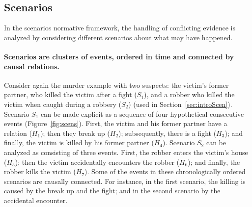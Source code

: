 \documentclass[10pt]{article}
\begin{document}

  


\subsection{Scenarios}

In the scenarios normative framework, the handling of conflicting evidence is analyzed by considering different scenarios about what may have happened.

\paragraph{Scenarios are clusters of events, ordered in time and connected by causal relations.} Consider again the murder example with two suspects: the victim's former partner, who killed the victim after a fight ($S_1$), and a robber who killed the victim when caught during a robbery ($S_2$) (used in Section~\ref{sec:introScen}). Scenario $S_1$ can be made explicit as a sequence of four hypothetical consecutive events (Figure~\ref{fig:scens}). First, the victim and his former partner have a relation ($H_1$); then they break up ($H_2$); subsequently, there is a fight ($H_3$); and finally, the victim is killed by his former partner ($H_4$). Scenario $S_2$ can be analyzed as consisting of three events. First, the robber enters the victim's house ($H_5$); then the victim accidentally encounters the robber ($H_6$); and finally, the robber kills the victim ($H_7$). Some of the events in these chronologically ordered scenarios are causally connected. For instance, in the first scenario, the killing is caused by the break up and the fight; and in the second scenario by the accidental encounter.
\end{document}
